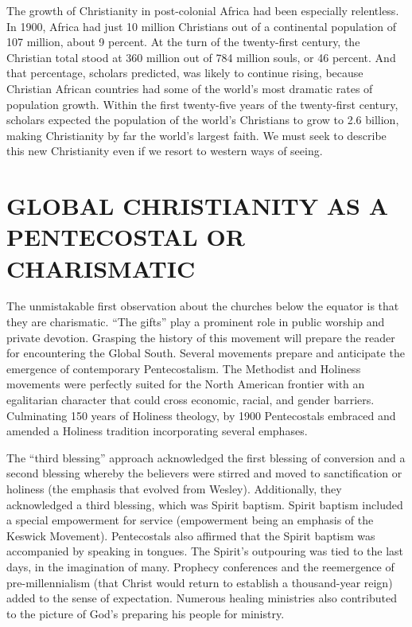 The growth of Christianity in post-colonial Africa had been especially relentless. In 1900, Africa
had just 10 million Christians out of a continental population of 107 million, about 9 percent. At
the turn of the twenty-first century, the Christian total stood at 360 million out of 784 million
souls, or 46 percent. And that percentage, scholars predicted, was likely to continue rising,
because Christian African countries had some of the world’s most dramatic rates of population
growth. Within the first twenty-five years of the twenty-first century, scholars expected the
population of the world’s Christians to grow to 2.6 billion, making Christianity by far the world’s
largest faith. We must seek to describe this new Christianity even if we resort to western ways of
seeing.

\section{GLOBAL CHRISTIANITY AS A PENTECOSTAL OR CHARISMATIC}

The unmistakable first observation about the churches below the equator is that they are
charismatic. “The gifts” play a prominent role in public worship and private devotion. Grasping the
history of this movement will prepare the reader for encountering the Global South. Several
movements prepare and anticipate the emergence of contemporary Pentecostalism. The Methodist and
Holiness movements were perfectly suited for the North American frontier with an egalitarian
character that could cross economic, racial, and gender barriers. Culminating 150 years of Holiness
theology, by 1900 Pentecostals embraced and amended a Holiness tradition incorporating several
emphases.

The “third blessing” approach acknowledged the first blessing of conversion and a second blessing
whereby the believers were stirred and moved to sanctification or holiness (the emphasis that
evolved from Wesley). Additionally, they acknowledged a third blessing, which was Spirit baptism.
Spirit baptism included a special empowerment for service (empowerment being an emphasis of the
Keswick Movement). Pentecostals also affirmed that the Spirit baptism was accompanied by speaking in
tongues. The Spirit’s outpouring was tied to the last days, in the imagination of many. Prophecy
conferences and the reemergence of pre-millennialism (that Christ would return to establish a
thousand-year reign) added to the sense of expectation. Numerous healing ministries also contributed
to the picture of God’s preparing his people for ministry.

